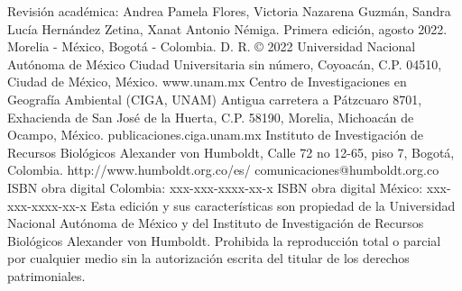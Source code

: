 \documentclass[
  12pt,
  letterpaper,
  twoside]{book}
\let\oldmaketitle\maketitle
\begin{document}
\begin{multicols*}{2}
{    \linebreak
    \newline Revisión académica: Andrea Pamela Flores, Victoria Nazarena Guzmán, Sandra Lucía Hernández Zetina, Xanat Antonio Némiga. \hspace*{\fill}
    \linebreak
    \newline Primera edición, agosto 2022. Morelia - México, Bogotá - Colombia.  
    D. R. © 2022 Universidad Nacional Autónoma de México 
    Ciudad Universitaria sin número, Coyoacán, C.P. 04510, Ciudad de México, México.
    www.unam.mx
    \newline Centro de Investigaciones en Geografía Ambiental (CIGA, UNAM) 
    Antigua carretera a Pátzcuaro 8701, Exhacienda de San José de la Huerta, C.P. 58190, Morelia, Michoacán de Ocampo, México.
    publicaciones.ciga.unam.mx
    \newline Instituto de Investigación de Recursos Biológicos
    Alexander von Humboldt, Calle 72 no 12-65, piso 7, Bogotá,
    Colombia. http://www.humboldt.org.co/es/
    comunicaciones@humboldt.org.co
    \newline ISBN obra digital Colombia: xxx-xxx-xxxx-xx-x \hspace*{\fill}
    \newline ISBN obra digital México: xxx-xxx-xxxx-xx-x \hspace*{\fill}
    \linebreak
    \newline Esta edición y sus características son propiedad de la Universidad Nacional Autónoma de México y del Instituto de Investigación de Recursos Biológicos Alexander von Humboldt. Prohibida la reproducción total o parcial por cualquier medio sin la autorización escrita del titular de los derechos patrimoniales.}
\end{multicols*}
\vspace*{\fill}

\let\maketitle\oldmaketitle
\maketitle

\renewcommand*\contentsname{Índice}
{
\hypersetup{linkcolor=black}
\setcounter{tocdepth}{1}
\tableofcontents
}
\setlength{\aweboxleftmargin}{0.1\linewidth}
\setlength{\aweboxcontentwidth}{0.85\linewidth}
\setlength{\aweboxvskip}{1mm}
\setlength{\aweboxrulewidth}{5pt}
\end{document}
